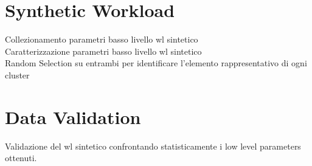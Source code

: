 \section{Synthetic Workload}
Collezionamento parametri basso livello wl sintetico
\\
Caratterizzazione parametri basso livello wl sintetico
\\
Random Selection su entrambi per identificare l'elemento rappresentativo di ogni cluster
\section{Data Validation}
Validazione del wl sintetico confrontando statisticamente i low level parameters ottenuti.